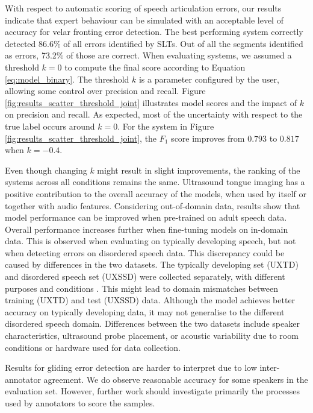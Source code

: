 With respect to automatic scoring of speech articulation errors, our results indicate that expert behaviour can be simulated with an acceptable level of accuracy for velar fronting error detection.
The best performing system correctly detected 86.6\% of all errors identified by SLTs.
Out of all the segments identified as errors, 73.2\% of those are correct.
When evaluating systems, we assumed a threshold $k=0$ to compute the final score according to Equation \ref{eq:model_binary}.
The threshold $k$ is a parameter configured by the user, allowing some control over precision and recall.
Figure \ref{fig:results_scatter_threshold_joint} illustrates model scores and the impact of $k$ on precision and recall.
As expected, most of the uncertainty with respect to the true label occurs around $k=0$.
For the system in Figure \ref{fig:results_scatter_threshold_joint}, the $F_1$ score improves from $0.793$ to $0.817$ when $k=-0.4$.

Even though changing $k$ might result in slight improvements, the ranking of the systems across all conditions remains the same.
Ultrasound tongue imaging has a positive contribution to the overall accuracy of the models, when used by itself or together with audio features.
Considering out-of-domain data, results show that model performance can be improved when pre-trained on adult speech data.
Overall performance increases further when fine-tuning models on in-domain data.
This is observed when evaluating on typically developing speech, but not when detecting errors on disordered speech data.
This discrepancy could be caused by differences in the two datasets.
The typically developing set (UXTD) and disordered speech set (UXSSD) were collected separately, with different purposes and conditions  \citep{eshky2018ultrasuite}.
This might lead to domain mismatches between training (UXTD) and test (UXSSD) data.
Although the model achieves better accuracy on typically developing data, it may not generalise to the different disordered speech domain.
Differences between the two datasets include speaker characteristics, ultrasound probe placement, or acoustic variability due to room conditions or hardware used for data collection.

Results for gliding error detection are harder to interpret due to low inter-annotator agreement.
We do observe reasonable accuracy for some speakers in the evaluation set.
However, further work should investigate primarily the processes used by annotators to score the samples.

